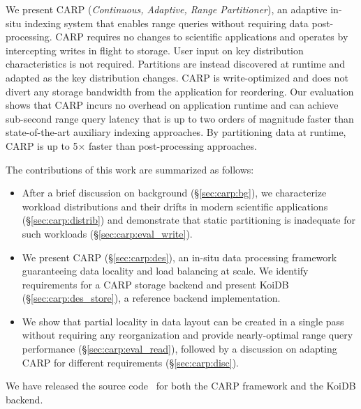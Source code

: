 We present CARP (\emph{Continuous, Adaptive, Range Partitioner}), an adaptive in-situ indexing
system that enables range queries without requiring data post-processing.
CARP requires no changes to scientific applications and operates by intercepting writes in flight
to storage.
User input on key distribution characteristics is not required.
Partitions are instead discovered at runtime and adapted as the key distribution changes.
CARP is write-optimized and does not divert any storage bandwidth from the application for
reordering.
Our evaluation shows that CARP incurs no overhead on application runtime and can achieve sub-second
range query latency that is up to two orders of magnitude faster than state-of-the-art auxiliary
indexing approaches.
By partitioning data at runtime, CARP is up to 5$\times$ faster than post-processing approaches.

The contributions of this work are summarized as follows:

\begin{itemize}
  \item After a brief discussion on background (\S\ref{sec:carp:bg}), we characterize workload
        distributions and their drifts in modern scientific applications (\S\ref{sec:carp:distrib}) and
        demonstrate that static partitioning is inadequate for such workloads
        (\S\ref{sec:carp:eval_write}).
  \item We present CARP (\S\ref{sec:carp:des}), an in-situ data processing framework guaranteeing
        data locality and load balancing at scale.
        We identify requirements for a CARP storage backend and present KoiDB (\S\ref{sec:carp:des_store}),
        a reference backend implementation.
  \item We show that partial locality in data layout can be created in a single pass without
        requiring any reorganization and provide nearly-optimal range query performance
        (\S\ref{sec:carp:eval_read}), followed by a discussion on adapting CARP for different requirements
        (\S\ref{sec:carp:disc}).

\end{itemize}

We have released the source code~\cite{Jain2024:CARP} for both the CARP framework and the KoiDB
backend.
